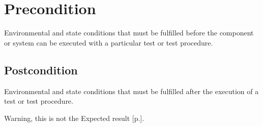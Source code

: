 \section{Precondition}
\label{sec:Precondition}

Environmental and state conditions that must be fulfilled before the component or system can be executed with a particular test or test procedure.

\subsection{Postcondition}
\label{sec:Postcondition}

Environmental and state conditions that must be fulfilled after the execution of a test or test procedure.

Warning, this is not the Expected result [p.\pageref{sec:Actual Result}].